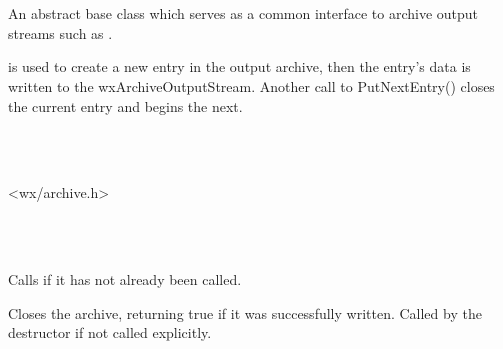 %
%

\section{}\label{wxarchiveoutputstream}

An abstract base class which serves as a common interface to
archive output streams such as .

 is used
to create a new entry in the output archive, then the entry's data is
written to the wxArchiveOutputStream.  Another call to PutNextEntry()
closes the current entry and begins the next.


\\
\\


<wx/archive.h>




\\
\\



\label{wxarchiveoutputstreamdtor}


Calls  if it has not already
been called.


\label{wxarchiveoutputstreamclose}


Closes the archive, returning true if it was successfully written.
Called by the destructor if not called explicitly.


\label{wxarchiveoutputstreamcloseentry}

